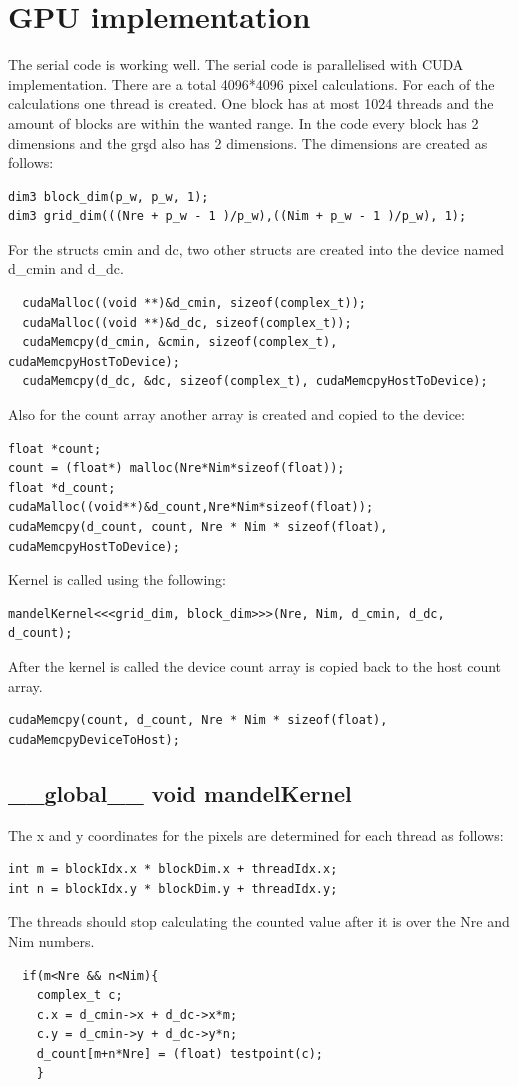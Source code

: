 \documentclass{article}
\begin{document}
\section{GPU implementation}
The serial code is working well. The serial code is parallelised with CUDA implementation. There are a total 4096*4096 pixel calculations. For each of the calculations one thread is created. One block has at most 1024 threads and the amount of blocks are within the wanted range. In the code every block has 2 dimensions and the grşd also has 2 dimensions. The dimensions are created as follows:
\begin{verbatim}
dim3 block_dim(p_w, p_w, 1);
dim3 grid_dim(((Nre + p_w - 1 )/p_w),((Nim + p_w - 1 )/p_w), 1);
\end{verbatim}
For the structs cmin and dc, two other structs are created into the device named d\_cmin and d\_dc.
\begin{verbatim}
  cudaMalloc((void **)&d_cmin, sizeof(complex_t));
  cudaMalloc((void **)&d_dc, sizeof(complex_t));
  cudaMemcpy(d_cmin, &cmin, sizeof(complex_t), cudaMemcpyHostToDevice);
  cudaMemcpy(d_dc, &dc, sizeof(complex_t), cudaMemcpyHostToDevice);
\end{verbatim}
Also for the count array another array is created and copied to the device:
\begin{verbatim}
float *count;
count = (float*) malloc(Nre*Nim*sizeof(float));
float *d_count;
cudaMalloc((void**)&d_count,Nre*Nim*sizeof(float));
cudaMemcpy(d_count, count, Nre * Nim * sizeof(float), cudaMemcpyHostToDevice);
\end{verbatim}
Kernel is called using the following:
\begin{verbatim}
mandelKernel<<<grid_dim, block_dim>>>(Nre, Nim, d_cmin, d_dc, d_count);
\end{verbatim}
After the kernel is called the device count array is copied back to the host count array.
\begin{verbatim}
cudaMemcpy(count, d_count, Nre * Nim * sizeof(float), cudaMemcpyDeviceToHost);
\end{verbatim}
\subsection{\_\_global\_\_ void mandelKernel}
The x and y coordinates for the pixels are determined for each thread as follows:
\begin{verbatim}
int m = blockIdx.x * blockDim.x + threadIdx.x;
int n = blockIdx.y * blockDim.y + threadIdx.y;
\end{verbatim}
The threads should stop calculating the counted value after it is over the Nre and Nim numbers.
\begin{verbatim}
  if(m<Nre && n<Nim){
    complex_t c;
    c.x = d_cmin->x + d_dc->x*m;
    c.y = d_cmin->y + d_dc->y*n;
    d_count[m+n*Nre] = (float) testpoint(c);
    }
\end{verbatim}
\end{document}
